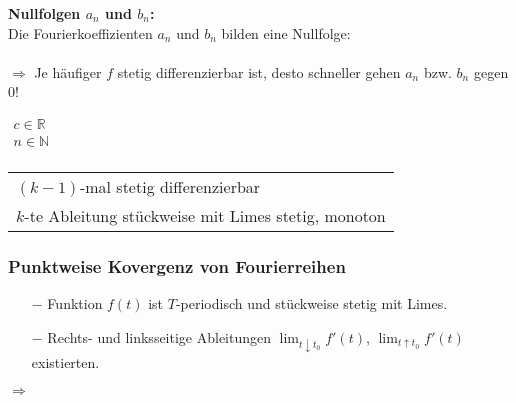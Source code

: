 				\textbf{Nullfolgen $a_n$ und $b_n$:}\\[3pt]
				Die Fourierkoeffizienten $a_n$ und $b_n$ bilden eine Nullfolge:\\[3pt]
				\\[3pt]
				$\Rightarrow$ Je häufiger $f$ stetig differenzierbar ist, desto schneller gehen $a_n$ bzw. $b_n$ gegen $0$!\\[3pt]
				\begin{minipage}[t]{0.5\textwidth}
					$\begin{array}{l}
						c \in \mathbb{R}\\
						n \in \mathbb{N}\\
					\end{array}$
				\end{minipage}
				\begin{minipage}[t]{0.5\textwidth}
					\begin{tabular}{l}
						$(k - 1)$-mal stetig differenzierbar\\
						$k$-te Ableitung stückweise mit Limes stetig, monoton\\
					\end{tabular}
				\end{minipage}
			
			\subsubsection{Punktweise Kovergenz von Fourierreihen}
				\begin{minipage}[t]{0.65\textwidth}
					\begin{itemize}
						\item[$-$] Funktion $f(t)$ ist $T$-periodisch und stückweise stetig mit Limes.
						\item[$-$] Rechts- und linksseitige Ableitungen $\displaystyle \lim_{t \downarrow t_0} f'(t)$, $\displaystyle \lim_{t \uparrow t_0} f'(t)$ existierten.
					\end{itemize}
					$\Rightarrow$ 
				\end{minipage}
				\begin{minipage}[t]{0.35\textwidth}
				\end{minipage}
			
